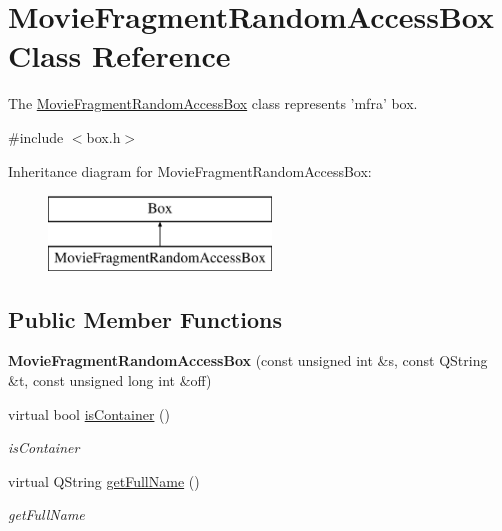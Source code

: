 \hypertarget{class_movie_fragment_random_access_box}{\section{Movie\-Fragment\-Random\-Access\-Box Class Reference}
\label{class_movie_fragment_random_access_box}
}


The \hyperlink{class_movie_fragment_random_access_box}{Movie\-Fragment\-Random\-Access\-Box} class represents 'mfra' box.  




{\ttfamily \#include $<$box.\-h$>$}

Inheritance diagram for Movie\-Fragment\-Random\-Access\-Box\-:\begin{figure}[H]
\begin{center}
\leavevmode
\includegraphics[height=2.000000cm]{class_movie_fragment_random_access_box}
\end{center}
\end{figure}
\subsection*{Public Member Functions}
\begin{DoxyCompactItemize}
\item 
\hypertarget{class_movie_fragment_random_access_box_a20a4b86e89a7a82e8df13d0457835c0b}{{\bfseries Movie\-Fragment\-Random\-Access\-Box} (const unsigned int \&s, const Q\-String \&t, const unsigned long int \&off)}\label{class_movie_fragment_random_access_box_a20a4b86e89a7a82e8df13d0457835c0b}

\item 
virtual bool \hyperlink{class_movie_fragment_random_access_box_a98067d945d3946d0bb3b41057b7bb24f}{is\-Container} ()
\begin{DoxyCompactList}\small\item\em is\-Container \end{DoxyCompactList}\item 
virtual Q\-String \hyperlink{class_movie_fragment_random_access_box_a6f57f73eaa945a9af8f5c512f5fd80da}{get\-Full\-Name} ()
\begin{DoxyCompactList}\small\item\em get\-Full\-Name \end{DoxyCompactList}\end{DoxyCompactItemize}
